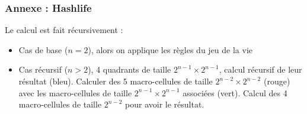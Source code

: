 \documentclass{beamer}
\begin{document}
\begin{frame}
    \frametitle{Annexe : Hashlife}
    
    Le calcul est fait récursivement :

    \begin{itemize}
        \item Cas de base ($n = 2$), alors on applique les règles du jeu de la vie  \vspace{10px}
        
        \item Cas récursif ($n > 2$), 4 quadrants de taille $2^{n-1} \times 2^{n-1}$, calcul récursif de leur résultat (bleu). Calculer des 5 macro-cellules de taille $2^{n-2} \times 2^{n-2}$ (rouge) avec les macro-cellules de taille $2^{n-1} \times 2^{n-1}$ associées (vert). Calcul des 4 macro-cellules de taille $2^{n-2}$ pour avoir le résultat.
    \end{itemize}
  

\end{frame}
\end{document}
